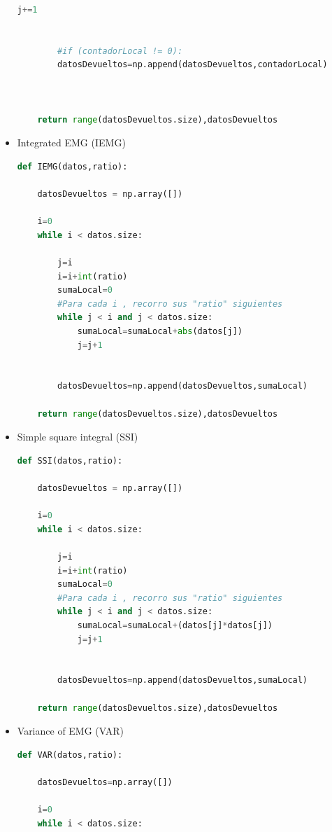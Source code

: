 \begin{itemize}
\begin{lstlisting}[language=Python]
            j+=1
        
        
        #if (contadorLocal != 0):
        datosDevueltos=np.append(datosDevueltos,contadorLocal)
          
        
        
    return range(datosDevueltos.size),datosDevueltos
\end{lstlisting}


\newpage
\item Integrated EMG (IEMG)
\begin{lstlisting}[language=Python]
def IEMG(datos,ratio):
    
    datosDevueltos = np.array([])
    
    i=0
    while i < datos.size:
        
        j=i
        i=i+int(ratio)
        sumaLocal=0
        #Para cada i , recorro sus "ratio" siguientes
        while j < i and j < datos.size:
            sumaLocal=sumaLocal+abs(datos[j])
            j=j+1
         
        
        datosDevueltos=np.append(datosDevueltos,sumaLocal)
        
    return range(datosDevueltos.size),datosDevueltos
\end{lstlisting}

\item Simple square integral (SSI)
\begin{lstlisting}[language=Python]
def SSI(datos,ratio):
    
    datosDevueltos = np.array([])
    
    i=0
    while i < datos.size:
        
        j=i
        i=i+int(ratio)
        sumaLocal=0
        #Para cada i , recorro sus "ratio" siguientes
        while j < i and j < datos.size:
            sumaLocal=sumaLocal+(datos[j]*datos[j])
            j=j+1
         
        
        datosDevueltos=np.append(datosDevueltos,sumaLocal)
        
    return range(datosDevueltos.size),datosDevueltos
\end{lstlisting}
\newpage
\item Variance of EMG (VAR)
\begin{lstlisting}[language=Python]
def VAR(datos,ratio):
    
    datosDevueltos=np.array([])
   
    i=0
    while i < datos.size:
        

\end{lstlisting}
\end{itemize}
